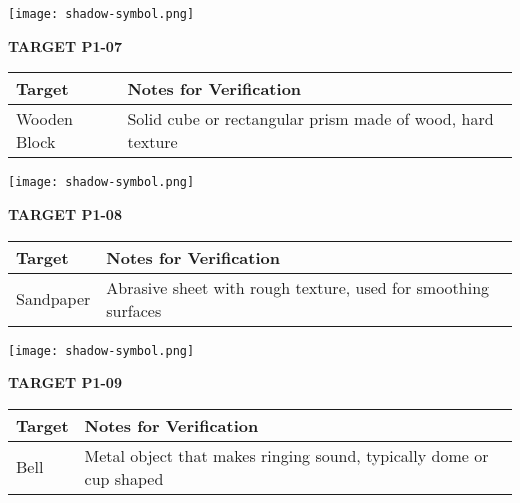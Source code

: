 \documentclass[10pt,twoside,final]{book} %
\makeatletter
\newcommand{\cleardoublepageWithSymbol}{%
  \clearpage %
  \if@twoside %
    \ifodd\c@page %
    \else %
      \thispagestyle{fancy} %
      \begingroup %
        \vspace*{0pt} %
        \vfill %
        \centering %
        \noindent 
        \texttt{[image: shadow-symbol.png]}
        \vfill %
      \endgroup
      \newpage    %
      \if@twocolumn\if@firstcolumn\else\hbox{}\newpage\fi\fi
    \fi
  \fi
}
\makeatother
\begin{document}
\cleardoublepageWithSymbol
\label{target:P1-07}

\begin{center}
\Large\textbf{TARGET P1-07}
\end{center}
\begin{mdframed}[backgroundcolor=white, linewidth=0.7pt, linecolor=rvprimary, shadow=true, shadowsize=1pt, shadowcolor=graydark!40, roundcorner=3pt]
\begin{tabular}{|p{3.5cm}|p{9cm}|}
\hline
\rowcolor{rvprimary!15}
\textbf{Target} & \textbf{Notes for Verification} \\
\hline
Wooden Block & Solid cube or rectangular prism made of wood, hard texture \\
\hline
\end{tabular}
\end{mdframed}


\cleardoublepageWithSymbol
\label{target:P1-08}
\begin{center}
\Large\textbf{TARGET P1-08}
\end{center}
\begin{mdframed}[backgroundcolor=white, linewidth=0.7pt, linecolor=rvprimary, shadow=true, shadowsize=1pt, shadowcolor=graydark!40, roundcorner=3pt]
\begin{tabular}{|p{3.5cm}|p{9cm}|}
\hline
\rowcolor{rvprimary!15}
\textbf{Target} & \textbf{Notes for Verification} \\
\hline
Sandpaper & Abrasive sheet with rough texture, used for smoothing surfaces \\
\hline
\end{tabular}
\end{mdframed}


\cleardoublepageWithSymbol
\label{target:P1-09}
\begin{center}
\Large\textbf{TARGET P1-09}
\end{center}
\begin{mdframed}[backgroundcolor=white, linewidth=0.7pt, linecolor=rvprimary, shadow=true, shadowsize=1pt, shadowcolor=graydark!40, roundcorner=3pt]
\begin{tabular}{|p{3.5cm}|p{9cm}|}
\hline
\rowcolor{rvprimary!15}
\textbf{Target} & \textbf{Notes for Verification} \\
\hline
Bell & Metal object that makes ringing sound, typically dome or cup shaped \\
\hline
\end{tabular}
\end{mdframed}
\end{document}
